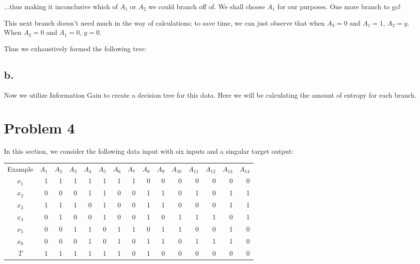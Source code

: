 \documentclass{article}
\begin{document}
\noindent ...thus making it inconclusive which of $A_1$ or $A_2$ we could branch off of. We shall choose $A_1$ for our purposes. One more branch to go!

This next branch doesn't need much in the way of calculations; to save time, we can just observe that when $A_3=0$ and $A_1=1$, $A_2=y$. When $A_3=0$ and $A_1=0$, $y=0$.

Thus we exhaustively formed the following tree:



\subsection*{b.}

Now we utilize Information Gain to create a decision tree for this data. Here we will be calculating the amount of entropy for each branch.

\section*{Problem 4}

In this section, we consider the following data input with six inputs and a singular target output:

\begin{center}
    \begin{tabular}{c r r r r r r r r r r r r r r}
        Example & $A_1$ & $A_2$ & $A_3$ & $A_4$ & $A_5$ & $A_6$ & $A_7$ & $A_8$ & $A_9$ & $A_10$ & $A_11$ & $A_12$ & $A_13$ & $A_14$ \\
        $x_1$ & 1 & 1 & 1 & 1 & 1 & 1 & 1 & 0 & 0 & 0 & 0 & 0 & 0 & 0 \\
        $x_2$ & 0 & 0 & 0 & 1 & 1 & 0 & 0 & 1 & 1 & 0 & 1 & 0 & 1 & 1 \\
        $x_3$ & 1 & 1 & 1 & 0 & 1 & 0 & 0 & 1 & 1 & 0 & 0 & 0 & 1 & 1 \\
        $x_4$ & 0 & 1 & 0 & 0 & 1 & 0 & 0 & 1 & 0 & 1 & 1 & 1 & 0 & 1 \\
        $x_5$ & 0 & 0 & 1 & 1 & 0 & 1 & 1 & 0 & 1 & 1 & 0 & 0 & 1 & 0 \\
        $x_6$ & 0 & 0 & 0 & 1 & 0 & 1 & 0 & 1 & 1 & 0 & 1 & 1 & 1 & 0 \\
        $T$ & 1 & 1 & 1 & 1 & 1 & 1 & 0 & 1 & 0 & 0 & 0 & 0 & 0 & 0 \\

    \end{tabular}
\end{center}
\end{document}
